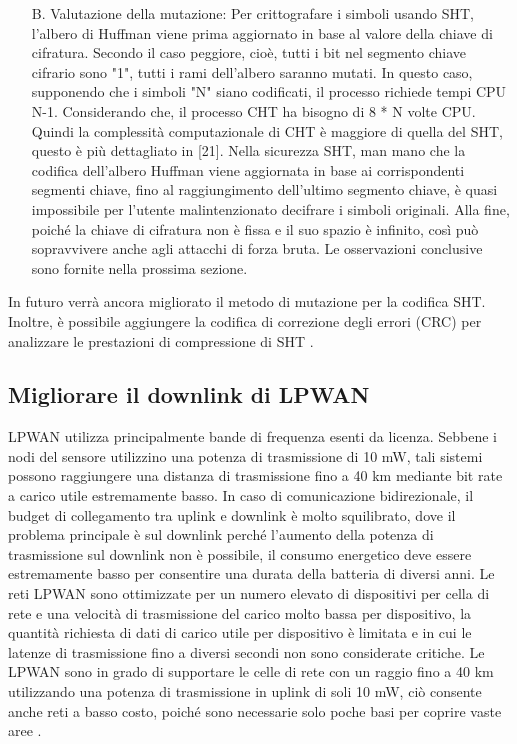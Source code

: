 \documentclass[a4paper]{report} %
\begin{document}
\begin{enumerate}
\item[B.] Valutazione della mutazione:
Per crittografare i simboli usando SHT, l'albero di Huffman viene prima aggiornato in base al valore della chiave di cifratura. Secondo il caso peggiore, cioè, tutti i bit nel segmento chiave cifrario sono "1", tutti i rami dell'albero saranno mutati. In questo caso, supponendo che i simboli "N" siano codificati, il processo richiede tempi CPU N-1. Considerando che, il processo CHT ha bisogno di 8 * N volte CPU. Quindi la complessità computazionale di CHT è maggiore di quella del SHT, questo è più dettagliato in [21]. Nella sicurezza SHT, man mano che la codifica dell'albero Huffman viene aggiornata in base ai corrispondenti segmenti chiave, fino al raggiungimento dell'ultimo segmento chiave, è quasi impossibile per l'utente malintenzionato decifrare i simboli originali. Alla fine, poiché la chiave di cifratura non è fissa e il suo spazio è infinito, così può sopravvivere anche agli attacchi di forza bruta. Le osservazioni conclusive sono fornite nella prossima sezione.
\end{enumerate}
In futuro verrà ancora migliorato il metodo di mutazione per la codifica SHT. Inoltre, è possibile aggiungere la codifica di correzione degli errori (CRC) per analizzare le prestazioni di compressione di SHT \cite{art:rif.45}.

\subsection{Migliorare il downlink di LPWAN}
LPWAN utilizza principalmente bande di frequenza esenti da licenza. Sebbene i nodi del sensore utilizzino una potenza di trasmissione di 10 mW, tali sistemi possono raggiungere una distanza di trasmissione fino a 40 km mediante bit rate a carico utile estremamente basso. In caso di comunicazione bidirezionale, il budget di collegamento tra uplink e downlink è molto squilibrato, dove il problema principale è sul downlink perché l'aumento della potenza di trasmissione sul downlink non è possibile, il consumo energetico deve essere estremamente basso per consentire una durata della batteria di diversi anni. Le reti LPWAN sono ottimizzate per un numero elevato di dispositivi per cella di rete e una velocità di trasmissione del carico molto bassa per dispositivo, la quantità richiesta di dati di carico utile per dispositivo è limitata e in cui le latenze di trasmissione fino a diversi secondi non sono considerate critiche. Le LPWAN sono in grado di supportare le celle di rete con un raggio fino a 40 km utilizzando una potenza di trasmissione in uplink di soli 10 mW, ciò consente anche reti a basso costo, poiché sono necessarie solo poche basi per coprire vaste aree \cite{art:rif.40}.
\end{document}
